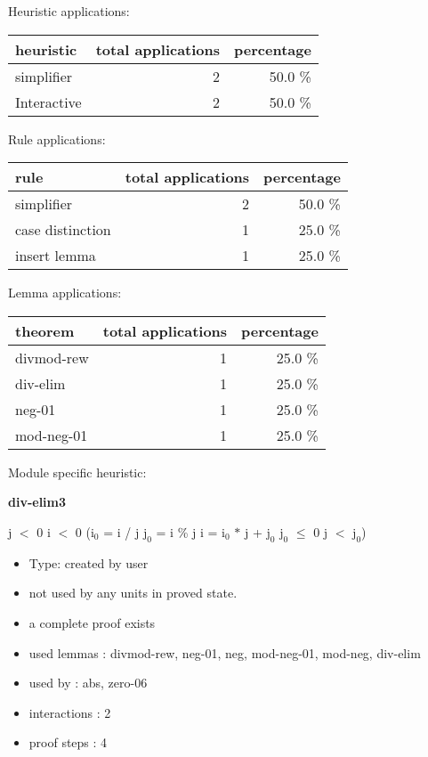 \documentclass[a4paper]{article}
\begin{document}
\medskip


Heuristic applications:

\begin{supertabular}{l|r|r}
heuristic	& total applications & percentage \\ \hline
simplifier & 2 & 50.0 \% \\
Interactive & 2 & 50.0 \% \\

\end{supertabular}

Rule applications:

\begin{supertabular}{l|r|r}
rule	        & total applications & percentage \\ \hline
simplifier & 2 & 50.0 \% \\
case distinction & 1 & 25.0 \% \\
insert lemma & 1 & 25.0 \% \\

\end{supertabular}

Lemma applications:

\begin{supertabular}{l|r|r}
theorem	        & total applications & percentage \\ \hline
divmod-rew & 1 & 25.0 \% \\
div-elim & 1 & 25.0 \% \\
neg-01 & 1 & 25.0 \% \\
mod-neg-01 & 1 & 25.0 \% \\

\end{supertabular}

Module specific heuristic:

\pagebreak

{\LARGE\bf div-elim3}\label{lemma-div-elim3}

\medskip

 \Fol j $<$ 0 \And i $<$ 0 \Imp ($\mbox{i}_{0}$ = i / j \And $\mbox{j}_{0}$ = i \% j \Equiv i = $\mbox{i}_{0}$ $*$ j + $\mbox{j}_{0}$ \And $\mbox{j}_{0}$ $\le$ 0 \And j $<$ $\mbox{j}_{0}$)

\begin{itemize}

\item Type: created by user

\item not used by any units in proved state.
\item       a complete proof exists
\item       used lemmas  : divmod-rew, neg-01, neg, mod-neg-01, mod-neg, div-elim
\item       used by      : abs, zero-06
\item       interactions : 2
\item       proof steps  : 4
\end{itemize}
\end{document}
